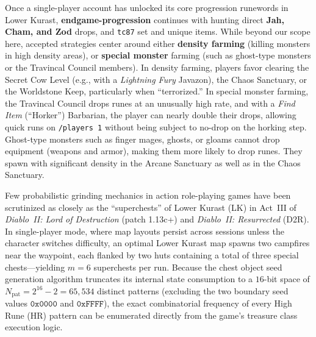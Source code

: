 \documentclass[11pt,reqno]{amsart}
\theoremstyle{definition}
\begin{document}
Once a single-player account has unlocked its core progression runewords in Lower Kurast, \textbf{endgame-progression} continues with hunting direct \textbf{Jah, Cham, and Zod} drops, and \texttt{tc87} set and unique items. While beyond our scope here, accepted strategies center around either \textbf{density farming} (killing monsters in high density areas), or \textbf{special monster} farming (such as ghost-type monsters or the Travincal Council members). In density farming, players favor clearing the Secret Cow Level (e.g., with a \emph{Lightning Fury} Javazon), the Chaos Sanctuary, or the Worldstone Keep, particularly when ``terrorized.'' In special monster farming, the Travincal Council drops runes at an unusually high rate, and with a \emph{Find Item} (``Horker'') Barbarian, the player can nearly double their drops, allowing quick runs on \texttt{/players~1} without being subject to no-drop on the horking step. Ghost-type monsters such as finger mages, ghosts, or gloams cannot drop equipment (weapons and armor), making them more likely to drop runes. They spawn with significant density in the Arcane Sanctuary as well as in the Chaos Sanctuary.

Few probabilistic grinding mechanics in action role-playing games have been scrutinized as closely as the ``superchests'' of Lower Kurast (LK) in Act~III of \emph{Diablo~II: Lord of Destruction} (patch 1.13c+) and \emph{Diablo~II: Resurrected} (D2R). In single-player mode, where map layouts persist across sessions unless the character switches difficulty, an optimal Lower Kurast map spawns two campfires near the waypoint, each flanked by two huts containing a total of three special chests—yielding $m = 6$ superchests per run. Because the chest object seed generation algorithm truncates its internal state consumption to a $16$-bit space of $N_{\text{pat}} = 2^{16} - 2 = 65{,}534$ distinct patterns (excluding the two boundary seed values $\mathtt{0x0000}$ and $\mathtt{0xFFFF}$), the exact combinatorial frequency of every High Rune (HR) pattern can be enumerated directly from the game's treasure class execution logic.
\end{document}
